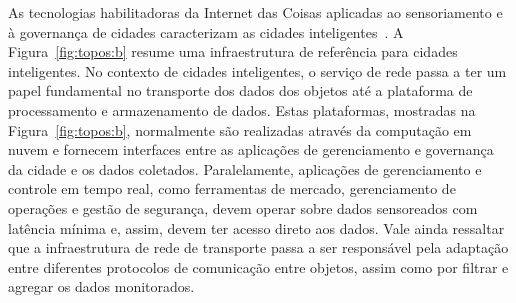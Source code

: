 \documentclass[12pt]{article}
\begin{document}
As tecnologias habilitadoras da Internet das Coisas aplicadas ao sensoriamento e à governança de cidades caracterizam as cidades inteligentes~\cite{interscity-paper}. 
A Figura~\ref{fig:topos:b} resume uma infraestrutura de referência para cidades inteligentes. No contexto de cidades inteligentes, o serviço de rede passa a ter um papel fundamental no transporte dos dados dos objetos até a plataforma de processamento e armazenamento de dados. 
Estas plataformas, mostradas na Figura~\ref{fig:topos:b}, normalmente
são realizadas através da computação em nuvem e fornecem interfaces entre as aplicações de gerenciamento e governança da cidade e os dados coletados. Paralelamente, aplicações de gerenciamento e controle em tempo real, como ferramentas de mercado, gerenciamento de operações e gestão de segurança, devem operar sobre dados sensoreados com latência mínima e, assim, devem ter acesso direto aos dados.
Vale ainda ressaltar que a infraestrutura de rede de transporte passa a ser responsável pela adaptação entre diferentes protocolos de comunicação entre objetos, assim como por filtrar e agregar os dados monitorados. %


\end{document}
